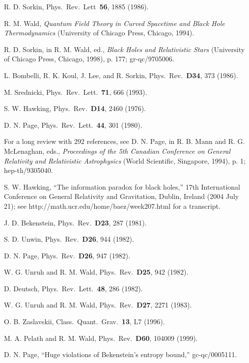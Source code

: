\documentclass[12pt]{article} \usepackage{latexsym} \textwidth 15cm
\begin{document}
\begin{thebibliography}{99}
 R. D. Sorkin, Phys.\ Rev.\ Lett\ {\bf 56}, 1885 (1986).

 R. M. Wald, \emph{Quantum Field Theory in Curved
  Spacetime and Black Hole Thermodynamics} (University of Chicago
  Press, Chicago, 1994).

 R. D. Sorkin, in R. M. Wald, ed., \emph{Black Holes
  and Relativistic Stars} (University of Chicago Press, Chicago,
  1998), p. 177; gr-qc/9705006.

 L. Bombelli, R. K. Koul, J. Lee, and R. Sorkin, Phys.\
  Rev.\ {\bf D34}, 373 (1986).

 M. Srednicki, Phys.\ Rev.\ Lett.\ {\bf 71}, 666 (1993).

 S. W. Hawking,  Phys.\ Rev.\ {\bf D14}, 2460 (1976).

 D. N. Page, Phys.\ Rev.\ Lett.\ {\bf 44}, 301 (1980).

 For a long review with 292 references, see
  D. N. Page, in R. B. Mann and R. G. McLenaghan, eds., \emph{
  Proceedings of the 5th Canadian Conference on General Relativity and
  Relativistic Astrophysics} (World Scientific, Singapore, 1994),
  p. 1; hep-th/9305040.

 S. W. Hawking, ``The information paradox for black
  holes,'' 17th International Conference on General Relativity and
  Gravitation, Dublin, Ireland (2004 July 21); see
  http://math.ucr.edu/home/baez/week207.html for a transcript.

 J. D. Bekenstein, Phys.\ Rev.\ {\bf D23}, 287 (1981).

 S. D. Unwin, Phys.\ Rev.\ {\bf D26}, 944 (1982).

 D. N. Page, Phys.\ Rev.\ {\bf D26}, 947 (1982).

 W. G. Unruh and R. M. Wald, Phys.\ Rev.\ {\bf D25}, 942
  (1982).

 D. Deutsch, Phys.\ Rev.\ Lett.\ {\bf 48}, 286
  (1982).

 W. G. Unruh and R. M. Wald, Phys.\ Rev.\ {\bf D27}, 2271
  (1983).

 O. B. Zaslavskii, Class.\ Quant.\ Grav.\ {\bf 13}, L7
  (1996).

 M. A. Pelath and R. M. Wald, Phys.\ Rev.\ {\bf D60}, 104009
  (1999).

 D. N. Page, ``Huge violations of Bekenstein's
  entropy bound,'' gc-qc/0005111.


\end{thebibliography}
\end{document}
